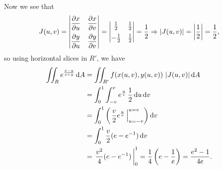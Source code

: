 \begin{example}
 Now we see that
 \[
 J(u,v) =
   \begin{vmatrix}
    \dfrac{\partial x}{\partial u} & \dfrac{\partial x}{\partial v}\vspace{2mm}\\
    \dfrac{\partial y}{\partial u} & \dfrac{\partial y}{\partial v}
   \end{vmatrix}
   =\begin{vmatrix}
    \frac12 & \frac12\vspace{2mm}\\
    -\frac12 & \frac12
   \end{vmatrix}
   = \frac12 \Rightarrow \abs{J(u,v)} = \abs{\frac12} = \frac12 ,
 \]
 so using horizontal slices in $R'$, we have
 \begin{align*}
  \iint_{R} e^{\frac{x-y}{x+y}} \operatorname{d}\! A &= \iint_{R'} f(x(u,v),y(u,v))\,\left\lvert J(u,v) \right\rvert\operatorname{d}\! A\\
  &= \int_0^1 \int_{-v}^v e^{\frac uv} \, \frac12\operatorname{d}\! u\operatorname{d}\! v\\
  &= \int_0^1 \left(\left. \frac v2 e^{\frac uv} \,\right|_{u=-v}^{u=v} \right) \operatorname{d}\! v\\
  &= \int_0^1 \frac v2 (e - e^{-1})\operatorname{d}\! v\\
  &= \left.\frac{v^2}4 (e - e^{-1}) \,\right|_{0}^{1}
  = \frac14 \left( e - \frac1e \right) = \frac{e^2 - 1}{4e}.
 \end{align*}
\end{example}

